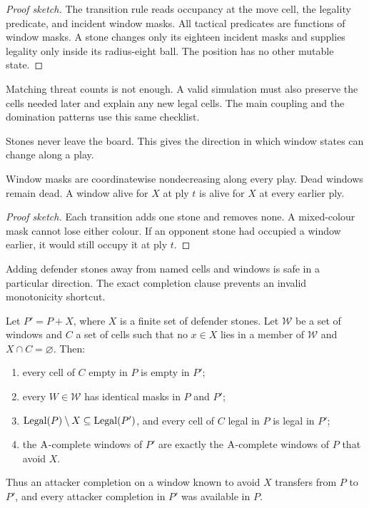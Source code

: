 \begin{proof}[Proof sketch]
The transition rule reads occupancy at the move cell, the legality predicate,
and incident window masks.  All tactical predicates are functions of window
masks.  A stone changes only its eighteen incident masks and supplies legality
only inside its radius-eight ball.  The position has no other mutable state.
\end{proof}

\begin{plainterms}
Matching threat counts is not enough.  A valid simulation must also preserve
the cells needed later and explain any new legal cells.  The main coupling and
the domination patterns use this same checklist.
\end{plainterms}

Stones never leave the board.  This gives the direction in which window states
can change along a play.

\begin{lemma}[Permanence]
\label{lem:L4}
Window masks are coordinatewise nondecreasing along every play.  Dead windows
remain dead.  A window alive for $X$ at ply $t$ is alive for $X$ at every
earlier ply.
\end{lemma}

\begin{proof}[Proof sketch]
Each transition adds one stone and removes none.  A mixed-colour mask cannot
lose either colour.  If an opponent stone had occupied a window earlier, it
would still occupy it at ply $t$.
\end{proof}

Adding defender stones away from named cells and windows is safe in a
particular direction.  The exact completion clause prevents an invalid
monotonicity shortcut.

\begin{lemma}
\label{lem:L5}
Let $P'=P+X$, where $X$ is a finite set of defender stones.  Let
$\mathcal W$ be a set of windows and $C$ a set of cells such that no
$x\in X$ lies in a member of $\mathcal W$ and $X\cap C=\varnothing$.  Then:
\begin{enumerate}[label=\textup{(\alph*)}]
  \item every cell of $C$ empty in $P$ is empty in $P'$;
  \item every $W\in\mathcal W$ has identical masks in $P$ and $P'$;
  \item $\operatorname{Legal}(P)\setminus X\subseteq\operatorname{Legal}(P')$, and every cell of $C$
  legal in $P$ is legal in $P'$;
  \item the $\mathrm{A}$-complete windows of $P'$ are exactly the $\mathrm{A}$-complete
  windows of $P$ that avoid $X$.
\end{enumerate}
Thus an attacker completion on a window known to avoid $X$ transfers from
$P$ to $P'$, and every attacker completion in $P'$ was available in $P$.
\end{lemma}

